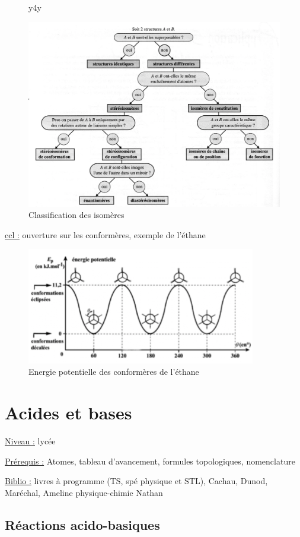 \documentclass{article}%
\begin{document}
\begin{figure}y4y
	\centerline{\includegraphics[width=15cm]{images/isomerie.png}}
	\caption{Classification des isomères}
\end{figure}

\underline{ccl :} ouverture sur les conformères, exemple de l'éthane
\begin{figure}
	\centerline{\includegraphics[width=10cm]{images/conformation_ethane.png}}
	\caption{Energie potentielle des conformères de l'éthane}
\end{figure}

\section{Acides et bases}
\underline{Niveau :} lycée

\underline{Prérequis :} Atomes, tableau d'avancement, formules topologiques, nomenclature

\underline{Biblio :} livres à programme (TS, spé physique et STL), Cachau, Dunod, Maréchal, Ameline physique-chimie Nathan 

\subsection{Réactions acido-basiques}
\end{document}
